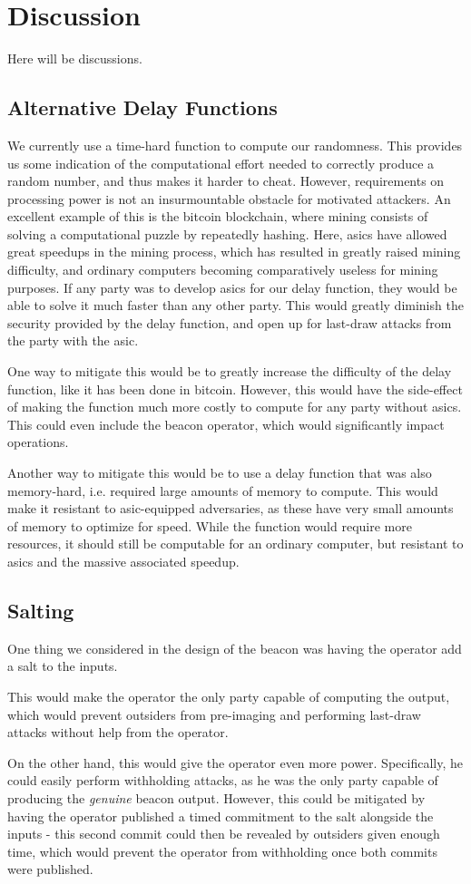 \section{Discussion}%
\label{sec:discussion}
Here will be discussions.

\subsection{Alternative Delay Functions}
We currently use a time-hard function to compute our randomness. This provides us some indication of the computational effort needed to correctly produce a random number, and thus makes it harder to cheat.
However, requirements on processing power is not an insurmountable obstacle for motivated attackers. An excellent example of this is the bitcoin blockchain, where mining consists of solving a computational puzzle by repeatedly hashing. Here, \acrfull{asic}s have allowed great speedups in the mining process, which has resulted in greatly raised mining difficulty, and ordinary computers becoming comparatively useless for mining purposes.
If any party was to develop \acrshort{asic}s for our delay function, they would be able to solve it much faster than any other party. This would greatly diminish the security provided by the delay function, and open up for last-draw attacks from the party with the \acrshort{asic}.

One way to mitigate this would be to greatly increase the difficulty of the delay function, like it has been done in bitcoin. However, this would have the side-effect of making the function much more costly to compute for any party without \acrshort{asic}s. This could even include the beacon operator, which would significantly impact operations.

Another way to mitigate this would be to use a delay function that was also memory-hard, i.e. required large amounts of memory to compute. This would make it resistant to \acrshort{asic}-equipped adversaries, as these have very small amounts of memory to optimize for speed. While the function would require more resources, it should still be computable for an ordinary computer, but resistant to \acrshort{asic}s and the massive associated speedup.

\subsection{Salting}

One thing we considered in the design of the beacon was having the operator add a salt to the inputs.

This would make the operator the only party capable of computing the output, which would prevent outsiders from pre-imaging and performing last-draw attacks without help from the operator.

On the other hand, this would give the operator even more power. Specifically, he could easily perform withholding attacks, as he was the only party capable of producing the \textit{genuine} beacon output. However, this could be mitigated by having the operator published a timed commitment to the salt alongside the inputs - this second commit could then be revealed by outsiders given enough time, which would prevent the operator from withholding once both commits were published.